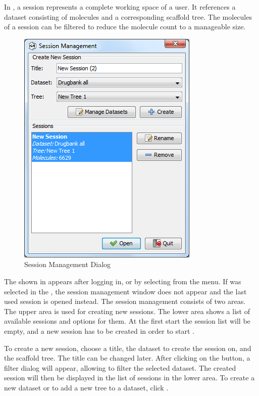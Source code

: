 In \sh, a session represents a complete working space of a user. It references a dataset consisting of molecules and a corresponding scaffold tree. The molecules of a session can be filtered to reduce the molecule count to a manageable size.

\begin{figure}[h]
   \centering
   \includegraphics[scale=0.8]{images/sh_session_dialog.png}
   \caption{Session Management Dialog}
   \label{fig:session_dialog}
\end{figure}

The  shown in  appears after logging in, or by selecting  from the menu. If  was selected in the , the session management window does not appear and the last used session is opened instead. The session management consists of two areas. The upper area is used for creating new sessions. The lower area shows a list of available sessions and options for them. At the first start the session list will be empty, and a new session has to be created in order to start \sh.

To create a new session, choose a title, the dataset to create the session on, and the scaffold tree. The title can be changed later. After clicking on the  button, a filter dialog will appear, allowing to filter the selected dataset. The created session will then be displayed in the list of sessions in the lower area. To create a new dataset or to add a new tree to a dataset, click .

